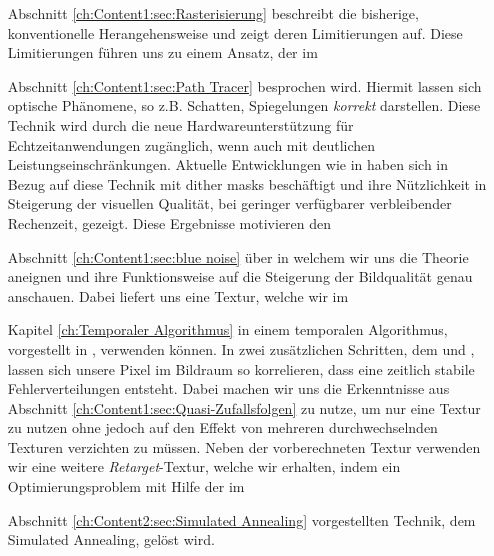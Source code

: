 \begin{itemize}
    \item[Abschnitt \ref{ch:Content1:sec:Rasterisierung}] beschreibt die bisherige, konventionelle Herangehensweise und zeigt deren Limitierungen auf. Diese 
        Limitierungen führen uns zu einem Ansatz, der im 

    \item[Abschnitt \ref{ch:Content1:sec:Path Tracer}] besprochen wird. Hiermit lassen sich optische Phänomene, so z.B. Schatten, Spiegelungen \textit{korrekt} darstellen.
        Diese Technik wird durch die neue Hardwareunterstützung für Echtzeitanwendungen zugänglich, wenn auch mit deutlichen Leistungseinschränkungen.
        Aktuelle Entwicklungen wie in \cite{georgiev2016blue} haben sich in Bezug auf diese Technik mit  dither masks beschäftigt
        und ihre Nützlichkeit in Steigerung der visuellen Qualität, bei geringer verfügbarer verbleibender Rechenzeit, gezeigt. Diese Ergebnisse motivieren den

    \item[Abschnitt \ref{ch:Content1:sec:blue noise}] über  in welchem wir uns die Theorie aneignen und ihre Funktionsweise auf die Steigerung der 
        Bildqualität genau anschauen. Dabei liefert uns \cite{bluenoisechrisschied} eine  Textur, welche wir im

    \item[Kapitel \ref{ch:Temporaler Algorithmus}]in einem temporalen Algorithmus, vorgestellt in \cite{hal02158423}, verwenden können. In zwei zusätzlichen Schritten, dem 
     und , lassen sich unsere Pixel im Bildraum so korrelieren, dass eine zeitlich stabile Fehlerverteilungen
    entsteht. Dabei machen wir uns die Erkenntnisse aus Abschnitt \ref{ch:Content1:sec:Quasi-Zufallsfolgen} zu nutze, um nur eine Textur zu nutzen ohne jedoch auf den Effekt von mehreren 
    durchwechselnden Texturen verzichten zu müssen. Neben der vorberechneten  Textur verwenden wir eine weitere \textit{Retarget}-Textur, welche wir erhalten, indem ein Optimierungsproblem 
    mit Hilfe der im  

    \item[Abschnitt \ref{ch:Content2:sec:Simulated Annealing}]vorgestellten Technik, dem Simulated Annealing, gelöst wird.   

\end{itemize}
 


